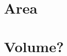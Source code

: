 %     
%     

%
\begin{figure}[htpb]%
    \centering%
    \caption{}%
\end{figure}%

\FloatBarrier
\section{Area}
\section{Volume?}

